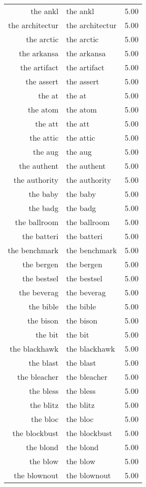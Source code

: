 \begin{table}[ht]
\begin{tabular}{rlr}
  the ankl & the ankl & 5.00 \\ 
  the architectur & the architectur & 5.00 \\ 
  the arctic & the arctic & 5.00 \\ 
  the arkansa & the arkansa & 5.00 \\ 
  the artifact & the artifact & 5.00 \\ 
  the assert & the assert & 5.00 \\ 
  the at & the at & 5.00 \\ 
  the atom & the atom & 5.00 \\ 
  the att & the att & 5.00 \\ 
  the attic & the attic & 5.00 \\ 
  the aug & the aug & 5.00 \\ 
  the authent & the authent & 5.00 \\ 
  the authority & the authority & 5.00 \\ 
  the baby & the baby & 5.00 \\ 
  the badg & the badg & 5.00 \\ 
  the ballroom & the ballroom & 5.00 \\ 
  the batteri & the batteri & 5.00 \\ 
  the benchmark & the benchmark & 5.00 \\ 
  the bergen & the bergen & 5.00 \\ 
  the bestsel & the bestsel & 5.00 \\ 
  the beverag & the beverag & 5.00 \\ 
  the bible & the bible & 5.00 \\ 
  the bison & the bison & 5.00 \\ 
  the bit & the bit & 5.00 \\ 
  the blackhawk & the blackhawk & 5.00 \\ 
  the blast & the blast & 5.00 \\ 
  the bleacher & the bleacher & 5.00 \\ 
  the bless & the bless & 5.00 \\ 
  the blitz & the blitz & 5.00 \\ 
  the bloc & the bloc & 5.00 \\ 
  the blockbust & the blockbust & 5.00 \\ 
  the blond & the blond & 5.00 \\ 
  the blow & the blow & 5.00 \\ 
  the blownout & the blownout & 5.00 \\ 

\end{tabular}
\end{table}
